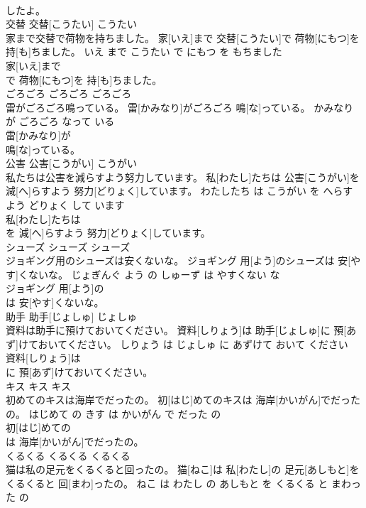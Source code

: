 \documentclass[8pt]{extreport}
\begin{document}
\begin{CJK}{UTF8}{min}
\\	したよ。			
\\	交替	交替[こうたい]	こうたい	
\\	家まで交替で荷物を持ちました。	家[いえ]まで 交替[こうたい]で 荷物[にもつ]を 持[も]ちました。	いえ まで こうたい で にもつ を もちました	
\\	家[いえ]まで
\\	で 荷物[にもつ]を 持[も]ちました。			
\\	ごろごろ	ごろごろ	ごろごろ	
\\	雷がごろごろ鳴っている。	雷[かみなり]がごろごろ 鳴[な]っている。	かみなり が ごろごろ なって いる	
\\	雷[かみなり]が
\\	鳴[な]っている。			
\\	公害	公害[こうがい]	こうがい	
\\	私たちは公害を減らすよう努力しています。	私[わたし]たちは 公害[こうがい]を 減[へ]らすよう 努力[どりょく]しています。	わたしたち は こうがい を へらす よう どりょく して います	
\\	私[わたし]たちは
\\	を 減[へ]らすよう 努力[どりょく]しています。			
\\	シューズ	シューズ	シューズ	
\\	ジョギング用のシューズは安くないな。	ジョギング 用[よう]のシューズは 安[やす]くないな。	じょぎんぐ よう の しゅーず は やすくない な	
\\	ジョギング 用[よう]の
\\	は 安[やす]くないな。			
\\	助手	助手[じょしゅ]	じょしゅ	
\\	資料は助手に預けておいてください。	資料[しりょう]は 助手[じょしゅ]に 預[あず]けておいてください。	しりょう は じょしゅ に あずけて おいて ください	
\\	資料[しりょう]は
\\	に 預[あず]けておいてください。			
\\	キス	キス	キス	
\\	初めてのキスは海岸でだったの。	初[はじ]めてのキスは 海岸[かいがん]でだったの。	はじめて の きす は かいがん で だった の	
\\	初[はじ]めての
\\	は 海岸[かいがん]でだったの。			
\\	くるくる	くるくる	くるくる	
\\	猫は私の足元をくるくると回ったの。	猫[ねこ]は 私[わたし]の 足元[あしもと]をくるくると 回[まわ]ったの。	ねこ は わたし の あしもと を くるくる と まわった の	

\end{CJK}
\end{document}
